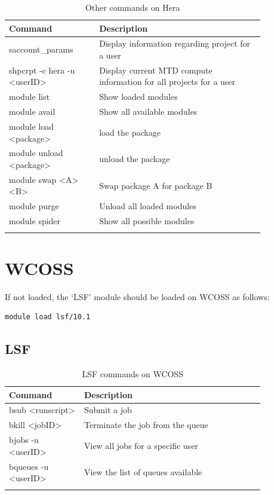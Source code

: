 \documentclass[11pt,fleqn]{report}              %
\begin{document}
{
\fontsize{10}{12}\selectfont
\begin{longtable}{p{0.3\linewidth} | p{0.55\linewidth} }
\hline
\hline
Command & Description \\
\hline
 saccount\_params & Display information regarding project for a user \\
 shpcrpt -c hera -u <userID> & Display current MTD compute information for all projects for a user \\
 module list & Show loaded modules \\
 module avail & Show all available modules \\
 module load <package> & load the package \\
 module unload <package> & unload the package \\
 module swap <A> <B> & Swap package A for package B \\
 module purge & Unload all loaded modules \\
 module spider & Show all possible modules \\
\hline
\caption{Other commands on Hera}
\label{table:command_hera_others}
\end{longtable}
}



\section{WCOSS}

If not loaded, the `LSF' module should be loaded on WCOSS as follows:
\lstset{language=bash}   
\begin{lstlisting}[frame=trBL]
module load lsf/10.1
\end{lstlisting}


\subsection{LSF}
{
\fontsize{10}{12}\selectfont
\begin{longtable}{ p{0.25\linewidth} | p{0.6\linewidth} }
\hline
\hline
Command & Description \\
\hline
bsub <runscript> & Submit a job  \\
bkill <jobID> & Terminate the job from the queue \\
bjobs -u <userID> & View all jobs for a specific user \\
bqueues -u <userID> & View the list of queues available \\
\hline
\caption{LSF commands on WCOSS}
\label{table:command_lsf_wcoss}
\end{longtable}
}
\end{document}
